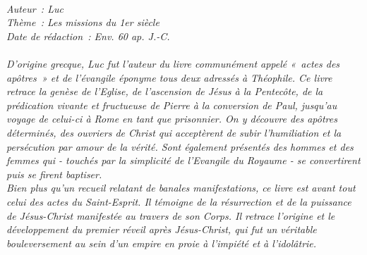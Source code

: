 \BFont
\noindent\hrulefill
{\footnotesize
\textit{
\bigskip
{\centering{}
\\Auteur~: Luc
\\Thème~: Les missions du 1er siècle
\\Date de rédaction~: Env. 60 ap. J.-C.\\}
}
\textit{
\\D'origine grecque, Luc fut l'auteur du livre communément appelé «~actes des apôtres~» et de l'évangile éponyme tous deux adressés à Théophile. Ce livre retrace la genèse de l'Eglise, de l'ascension de Jésus à la Pentecôte, de la prédication vivante et fructueuse de Pierre à la conversion de Paul, jusqu'au voyage de celui-ci à Rome en tant que prisonnier. On y découvre des apôtres déterminés, des ouvriers de Christ qui acceptèrent de subir l'humiliation et la persécution par amour de la vérité. Sont également présentés des hommes et des femmes qui - touchés par la simplicité de l'Evangile du Royaume - se convertirent puis se firent baptiser.
\\Bien plus qu'un recueil relatant de banales manifestations, ce livre est avant tout celui des actes du Saint-Esprit. Il témoigne de la résurrection et de la puissance de Jésus-Christ manifestée au travers de son Corps. Il retrace l'origine et le développement du premier réveil après Jésus-Christ, qui fut un véritable bouleversement au sein d'un empire en proie à l'impiété et à l'idolâtrie.\bigskip
}
}
\par\nobreak\noindent\hrulefill
